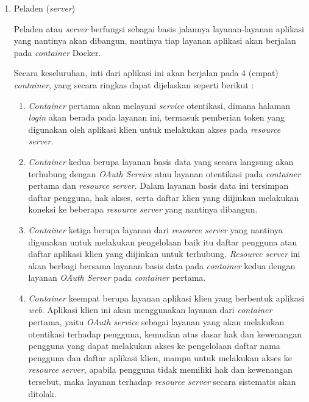 \documentclass[pdftex,12pt, oneside]{article}
\begin{document}
\begin{enumerate}
	\item Peladen (\textit{server}) 
	
Peladen atau \textit{server} berfungsi sebagai basis jalannya layanan-layanan aplikasi yang nantinya akan dibangun, nantinya tiap layanan aplikasi akan berjalan pada \textit{container} Docker.

Secara keseluruhan, inti dari aplikasi ini akan berjalan pada 4 (empat) \textit{container}, yang secara ringkas dapat dijelaskan seperti berikut :

\begin{enumerate}

	\item \textit{Container} pertama akan melayani \textit{service} otentikasi, dimana halaman \textit{login} akan berada pada layanan ini, termasuk pemberian token yang digunakan oleh aplikasi klien untuk melakukan akses pada \textit{resource server}. 
	
	\item \textit{Container} kedua berupa layanan basis data yang secara langsung akan terhubung dengan \textit{OAuth Service} atau layanan otentikasi pada \textit{container} pertama dan \textit{resource server}. Dalam layanan basis data ini tersimpan daftar pengguna, hak akses, serta daftar klien yang diijinkan melakukan koneksi ke beberapa \textit{resource server} yang nantinya dibangun.
	
	\item \textit{Container} ketiga berupa layanan dari \textit{resource server} yang nantinya digunakan untuk melakukan pengelolaan baik itu daftar pengguna atau daftar aplikasi klien yang diijinkan untuk terhubung. \textit{Resource server} ini akan berbagi bersama layanan basis data pada \textit{container} kedua dengan layanan \textit{OAuth Server} pada \textit{container} pertama.
	
	\item \textit{Container} keempat berupa layanan aplikasi klien yang berbentuk aplikasi \textit{web}. Aplikasi klien ini akan menggunakan layanan dari \textit{container} pertama, yaitu \textit{OAuth service} sebagai layanan yang akan melakukan otentikasi terhadap pengguna, kemudian atas dasar hak dan kewenangan pengguna yang dapat melakukan akses ke pengelolaan daftar nama pengguna dan daftar aplikasi klien, mampu untuk melakukan akses ke \textit{resource server}, apabila pengguna tidak memiliki hak dan kewenangan tersebut, maka layanan terhadap \textit{resource server} secara sistematis akan ditolak.
	

\end{enumerate}
\end{enumerate}
\end{document}
